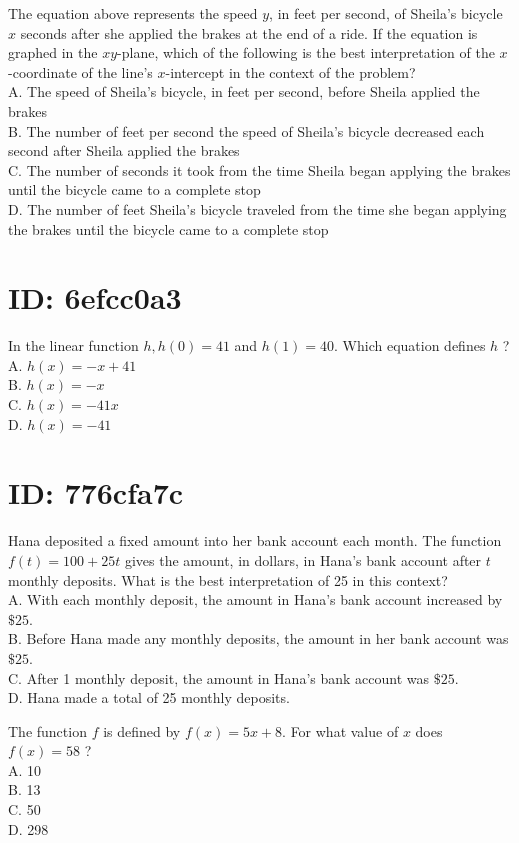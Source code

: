 The equation above represents the speed $y$, in feet per second, of Sheila's bicycle $x$ seconds after she applied the brakes at the end of a ride. If the equation is graphed in the $x y$-plane, which of the following is the best interpretation of the $x$-coordinate of the line's $x$-intercept in the context of the problem?\\
A. The speed of Sheila's bicycle, in feet per second, before Sheila applied the brakes\\
B. The number of feet per second the speed of Sheila's bicycle decreased each second after Sheila applied the brakes\\
C. The number of seconds it took from the time Sheila began applying the brakes until the bicycle came to a complete stop\\
D. The number of feet Sheila's bicycle traveled from the time she began applying the brakes until the bicycle came to a complete stop

\section*{ID: 6efcc0a3}
In the linear function $h, h(0)=41$ and $h(1)=40$. Which equation defines $h$ ?\\
A. $h(x)=-x+41$\\
B. $h(x)=-x$\\
C. $h(x)=-41 x$\\
D. $h(x)=-41$

\section*{ID: 776cfa7c}
Hana deposited a fixed amount into her bank account each month. The function $f(t)=100+25 t$ gives the amount, in dollars, in Hana's bank account after $t$ monthly deposits. What is the best interpretation of 25 in this context?\\
A. With each monthly deposit, the amount in Hana's bank account increased by $\$ 25$.\\
B. Before Hana made any monthly deposits, the amount in her bank account was $\$ 25$.\\
C. After 1 monthly deposit, the amount in Hana's bank account was $\$ 25$.\\
D. Hana made a total of 25 monthly deposits.

The function $f$ is defined by $f(x)=5 x+8$. For what value of $x$ does $f(x)=58$ ?\\
A. 10\\
B. 13\\
C. 50\\
D. 298

